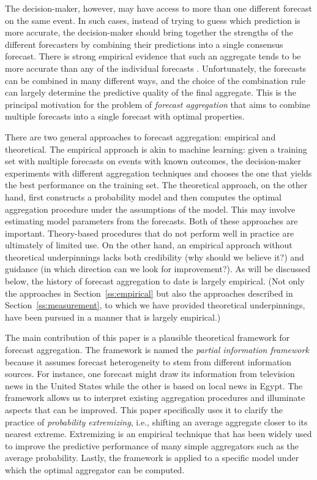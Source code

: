\documentclass[12pt]{article}
\theoremstyle{definition}
\theoremstyle{definition}
\begin{document}
The decision-maker, however, may have access to more than one different forecast on the same event. In such cases, instead of trying to guess which prediction is more accurate, the decision-maker should bring together the strengths of the different forecasters by combining their predictions into a single consensus forecast. There is strong empirical evidence that such an aggregate tends to be more accurate than any of the individual forecasts \citep{armstrong2001combining}. Unfortunately, the forecasts can be combined in many different ways, and the choice of the combination
rule can largely determine the predictive quality of the final
aggregate.  
This is the principal motivation for the problem of  \textit{forecast aggregation} that aims to combine multiple forecasts into a single
forecast with optimal properties.

There are two general approaches to forecast aggregation: empirical
and theoretical.  The empirical approach is akin to machine
learning: given a training set with multiple forecasts on events with
known outcomes, the decision-maker experiments with different
aggregation techniques and chooses the one that yields the best performance on the training set.
The theoretical approach, on the other hand, first constructs a
probability model and then computes the optimal aggregation procedure
under the assumptions of the model.  This may involve estimating model
parameters from the forecasts. Both of these approaches are important.  Theory-based procedures that do not
perform well in practice are ultimately of limited use.  On the other
hand, an empirical approach without theoretical underpinnings lacks
both credibility (why should we believe it?)  and guidance (in which
direction can we look for improvement?). As will be discussed below, the history of forecast aggregation to date is largely
empirical. (Not only the approaches in
Section~\ref{ss:empirical} but also the approaches described in
Section~\ref{ss:measurement}, to which we have provided theoretical
underpinnings, have been pursued in a manner that is largely
empirical.)

The main contribution of this paper is a plausible
theoretical framework for forecast aggregation. The framework is named the \textit{partial information framework} because it assumes forecast heterogeneity to stem from different information sources. For instance, one forecast might draw its information from television news in the United States
while the other is based on local news in Egypt.
 The framework allows
us to interpret existing aggregation procedures and illuminate aspects
that can be improved. This paper specifically uses it to clarify the practice of {\em probability
extremizing}, i.e., shifting an average aggregate closer to its nearest
extreme. Extremizing is an empirical technique that has been widely used to
improve the predictive performance of many simple aggregators such as
the average probability. Lastly, the framework is applied to a
specific model under which the optimal aggregator can be computed.
\end{document}
